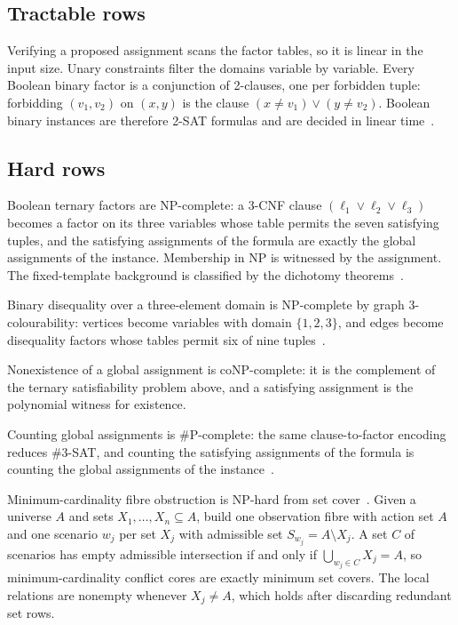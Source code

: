 \documentclass[11pt]{article}
\theoremstyle{plain}
\theoremstyle{definition}
\theoremstyle{remark}
\begin{document}
\subsection{Tractable rows}

Verifying a proposed assignment scans the factor tables, so it is linear in
the input size.  Unary constraints filter the domains variable by variable.
Every Boolean binary factor is a conjunction of 2-clauses, one per forbidden
tuple: forbidding \((v_1,v_2)\) on \((x,y)\) is the clause
\((x\ne v_1)\lor(y\ne v_2)\).  Boolean binary instances are therefore
2-SAT formulas and are decided in linear time~\cite{apt79}.

\subsection{Hard rows}

Boolean ternary factors are NP-complete: a 3-CNF clause
\((\ell_1\lor\ell_2\lor\ell_3)\) becomes a factor on its three variables
whose table permits the seven satisfying tuples, and the satisfying
assignments of the formula are exactly the global assignments of the
instance.  Membership in NP is witnessed by the assignment.  The
fixed-template background is classified by the dichotomy
theorems~\cite{schaefer78,zhuk17}.

Binary disequality over a three-element domain is NP-complete by graph
3-colourability: vertices become variables with domain \(\{1,2,3\}\), and
edges become disequality factors whose tables permit six of nine
tuples~\cite{gareyjohnson79}.

Nonexistence of a global assignment is coNP-complete: it is the complement
of the ternary satisfiability problem above, and a satisfying assignment is
the polynomial witness for existence.

Counting global assignments is \#P-complete: the same clause-to-factor
encoding reduces \#3-SAT, and counting the satisfying assignments of the
formula is counting the global assignments of the
instance~\cite{valiant79,creignou-hermann96}.

Minimum-cardinality fibre obstruction is NP-hard from set
cover~\cite{karp72}.  Given a universe \(A\) and sets \(X_1,\dots,X_n
\subseteq A\), build one observation fibre with action set \(A\) and one
scenario \(w_j\) per set \(X_j\) with admissible set \(S_{w_j}=A\setminus
X_j\).  A set \(C\) of scenarios has empty admissible intersection if and
only if \(\bigcup_{w_j\in C}X_j=A\), so minimum-cardinality conflict cores
are exactly minimum set covers.  The local relations are nonempty whenever
\(X_j\ne A\), which holds after discarding redundant set rows.
\end{document}
